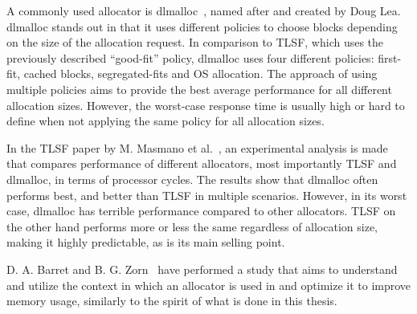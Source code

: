

A commonly used allocator is dlmalloc~\cite{dlmalloc}, named after and created by Doug Lea. dlmalloc stands out in that it uses different policies to choose blocks depending on the size of the allocation request. In comparison to TLSF, which uses the previously described ``good-fit'' policy, dlmalloc uses four different policies: first-fit, cached blocks, segregated-fits and OS allocation. The approach of using multiple policies aims to provide the best average performance for all different allocation sizes. However, the worst-case response time is usually high or hard to define when not applying the same policy for all allocation sizes.

In the TLSF paper by M. Masmano et al.~\cite{TLSF}, an experimental analysis is made that compares performance of different allocators, most importantly TLSF and dlmalloc, in terms of processor cycles. The results show that dlmalloc often performs best, and better than TLSF in multiple scenarios. However, in its worst case, dlmalloc has terrible performance compared to other allocators. TLSF on the other hand performs more or less the same regardless of allocation size, making it highly predictable, as is its main selling point.



\newpage


D. A. Barret and B. G. Zorn~\cite{lifetime_predictors_memalloc} have performed a study that aims to understand and utilize the context in which an allocator is used in and optimize it to improve memory usage, similarly to the spirit of what is done in this thesis. 

